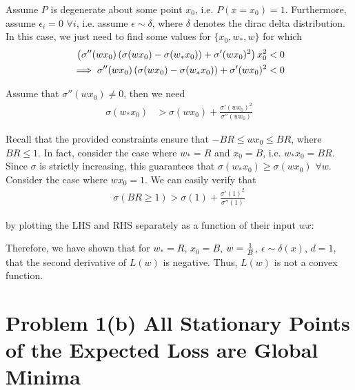 \documentclass[11pt]{article}
\newcommand{\1}{\mathbb{I}} %
\begin{document}
Assume $P$ is degenerate about some point $x_0$, i.e. $P(x = x_0) = 1$. Furthermore, assume $\epsilon_i = 0$ $\forall i$, i.e. assume $\epsilon \sim \delta$, where $\delta$ denotes the dirac delta distribution. In this case, we just need to find some values for $\{x_0, w_*, w\}$ for which
\begin{align}
	\left(  \sigma''(wx_0) \left( \sigma(wx_0) - \sigma(w_* x_0) \right) + \sigma'(wx_0)^2    \right) x_0^2  
		&< 0 \\
	\implies \sigma''(wx_0) \left( \sigma(wx_0) - \sigma(w_* x_0) \right) + \sigma'(wx_0)^2   
		&< 0
\end{align}

Assume that $\sigma''(wx_0) \neq 0$, then we need 
\begin{align}
	\sigma(w_* x_0) 
		&> \sigma(w x_0) + \frac{ \sigma'(wx_0)^2}{ \sigma''(wx_0)}
\end{align}

Recall that the provided constraints ensure that $-BR \leq wx_0 \leq BR$, where $BR \leq 1$. In fact, consider the case where $w_* = R$ and $x_0 = B$, i.e. $w_* x_0 = BR$. Since $\sigma$ is strictly increasing, this guarantees that $\sigma(w_* x_0) \geq \sigma(w x_0)$ $\forall w$. Consider the case where $w x_0 = 1$. We can easily verify that 
\begin{align}
	\sigma(BR \geq 1) 	
		> \sigma(1)+ \frac{ \sigma'(1)^2}{ \sigma''(1)}
\end{align}

by plotting the LHS and RHS separately as a function of their input $wx$:


Therefore, we have shown that for $w_* = R$, $x_0 = B$, $w = \frac{1}{B}$, $\epsilon \sim \delta(x)$, $d=1$, that the second derivative of $L(w)$ is negative. Thus, $L(w)$ is not a convex function. 





\clearpage
\section*{Problem 1(b) All Stationary Points of the Expected Loss are Global Minima}

\end{document}
